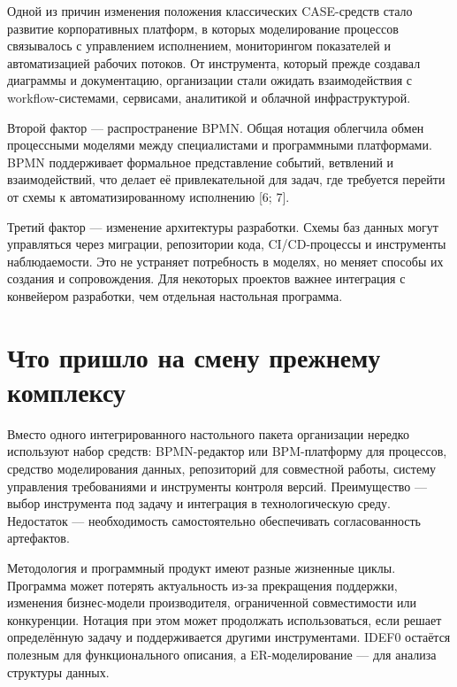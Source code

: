 \documentclass[essaypaper,paper]{pmk-graduate}
\begin{document}
Одной из причин изменения положения классических CASE-средств стало развитие корпоративных платформ, в которых моделирование процессов связывалось с управлением исполнением, мониторингом показателей и автоматизацией рабочих потоков. От инструмента, который прежде создавал диаграммы и документацию, организации стали ожидать взаимодействия с workflow-системами, сервисами, аналитикой и облачной инфраструктурой.

\par

Второй фактор — распространение BPMN. Общая нотация облегчила обмен процессными моделями между специалистами и программными платформами. BPMN поддерживает формальное представление событий, ветвлений и взаимодействий, что делает её привлекательной для задач, где требуется перейти от схемы к автоматизированному исполнению [6; 7].

\par

Третий фактор — изменение архитектуры разработки. Схемы баз данных могут управляться через миграции, репозитории кода, CI/CD-процессы и инструменты наблюдаемости. Это не устраняет потребность в моделях, но меняет способы их создания и сопровождения. Для некоторых проектов важнее интеграция с конвейером разработки, чем отдельная настольная программа.

\par

\section{Что пришло на смену прежнему комплексу}

Вместо одного интегрированного настольного пакета организации нередко используют набор средств: BPMN-редактор или BPM-платформу для процессов, средство моделирования данных, репозиторий для совместной работы, систему управления требованиями и инструменты контроля версий. Преимущество — выбор инструмента под задачу и интеграция в технологическую среду. Недостаток — необходимость самостоятельно обеспечивать согласованность артефактов.

\par

Методология и программный продукт имеют разные жизненные циклы. Программа может потерять актуальность из-за прекращения поддержки, изменения бизнес-модели производителя, ограниченной совместимости или конкуренции. Нотация при этом может продолжать использоваться, если решает определённую задачу и поддерживается другими инструментами. IDEF0 остаётся полезным для функционального описания, а ER-моделирование — для анализа структуры данных.
\end{document}
